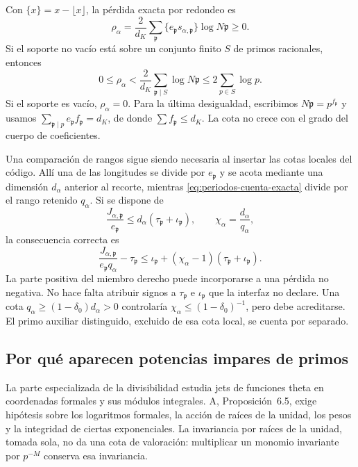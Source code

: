 Con $\{x\}=x-\lfloor x\rfloor$, la pérdida exacta por redondeo es
\[
 \rho_\alpha=\frac2{d_K}\sum_\mathfrak p
 \{e_\mathfrak p s_{\alpha,\mathfrak p}\}\log N\mathfrak p\ge0.
\]
Si el soporte no vacío está sobre un conjunto finito $S$ de primos
racionales, entonces
\begin{equation}
 0\le\rho_\alpha<\frac2{d_K}
     \sum_{\mathfrak p\mid S}\log N\mathfrak p
 \le2\sum_{p\in S}\log p.
 \label{eq:periodos-redondeo}
\end{equation}
Si el soporte es vacío, $\rho_\alpha=0$. Para la última desigualdad,
escribimos $N\mathfrak p=p^{f_\mathfrak p}$ y usamos
$\sum_{\mathfrak p\mid p}e_\mathfrak p f_\mathfrak p=d_K$,
de donde $\sum f_\mathfrak p\le d_K$. La cota no crece con el
grado del cuerpo de coeficientes.

Una comparación de rangos sigue siendo necesaria al insertar las cotas
locales del código. Allí una de las longitudes se divide por
$e_\mathfrak p$ y se acota mediante una dimensión $d_\alpha$
anterior al recorte, mientras \eqref{eq:periodos-cuenta-exacta}
divide por el rango retenido $q_\alpha$. Si se dispone de
\[
 \frac{J_{\alpha,\mathfrak p}}{e_\mathfrak p}
       \le d_\alpha(\tau_\mathfrak p+\iota_\mathfrak p),
 \qquad \chi_\alpha=\frac{d_\alpha}{q_\alpha},
\]
la consecuencia correcta es
\begin{equation}
 \frac{J_{\alpha,\mathfrak p}}{e_\mathfrak p q_\alpha}
       -\tau_\mathfrak p
 \le\iota_\mathfrak p+
             (\chi_\alpha-1)(\tau_\mathfrak p+\iota_\mathfrak p).
 \label{eq:periodos-coste-rango}
\end{equation}
La parte positiva del miembro derecho puede incorporarse a una
pérdida no negativa. No hace falta atribuir signos a
$\tau_\mathfrak p$ e $\iota_\mathfrak p$ que la interfaz no declare.
Una cota $q_\alpha\ge(1-\delta_0)d_\alpha>0$ controlaría
$\chi_\alpha\le(1-\delta_0)^{-1}$, pero debe acreditarse.
El primo auxiliar distinguido, excluido de esa cota local, se cuenta
por separado.

\subsection{Por qué aparecen potencias impares de primos}

La parte especializada de la divisibilidad estudia jets de funciones
theta en coordenadas formales y sus módulos integrales. A,
Proposición~6.5, exige hipótesis sobre los logaritmos formales, la
acción de raíces de la unidad, los pesos y la integridad de ciertas
exponenciales. La invariancia por raíces de la unidad, tomada sola,
no da una cota de valoración: multiplicar un monomio invariante por
$p^{-M}$ conserva esa invariancia.

